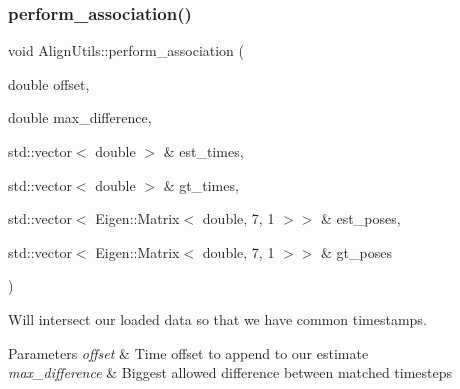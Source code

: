 \subsubsection{\texorpdfstring{perform\+\_\+association()}{perform\_association()}\hspace{0.1cm}{\footnotesize\ttfamily [1/2]}}
{\footnotesize\ttfamily void Align\+Utils\+::perform\+\_\+association (\begin{DoxyParamCaption}\item[{double}]{offset,  }\item[{double}]{max\+\_\+difference,  }\item[{std\+::vector$<$ double $>$ \&}]{est\+\_\+times,  }\item[{std\+::vector$<$ double $>$ \&}]{gt\+\_\+times,  }\item[{std\+::vector$<$ Eigen\+::\+Matrix$<$ double, 7, 1 $>$$>$ \&}]{est\+\_\+poses,  }\item[{std\+::vector$<$ Eigen\+::\+Matrix$<$ double, 7, 1 $>$$>$ \&}]{gt\+\_\+poses }\end{DoxyParamCaption})\hspace{0.3cm}{\ttfamily [static]}}



Will intersect our loaded data so that we have common timestamps. 


\begin{DoxyParams}{Parameters}
{\em offset} & Time offset to append to our estimate \\
\hline
{\em max\+\_\+difference} & Biggest allowed difference between matched timesteps \\
\hline
\end{DoxyParams}
\mbox{\label{classov__eval_1_1AlignUtils_afd79761c342430237a1ecf563d5c0d05}} 
